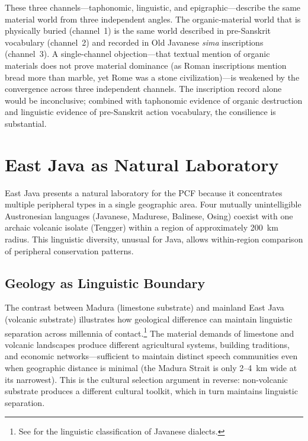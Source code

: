 \documentclass[12pt,a4paper]{article}
\begin{document}
These three channels---taphonomic, linguistic, and epigraphic---describe the same material world from three independent angles. The organic-material world that is physically buried (channel~1) is the same world described in pre-Sanskrit vocabulary (channel~2) and recorded in Old Javanese \emph{sima} inscriptions (channel~3). A single-channel objection---that textual mention of organic materials does not prove material dominance (as Roman inscriptions mention bread more than marble, yet Rome was a stone civilization)---is weakened by the convergence across three independent channels. The inscription record alone would be inconclusive; combined with taphonomic evidence of organic destruction and linguistic evidence of pre-Sanskrit action vocabulary, the consilience is substantial.

\section{East Java as Natural Laboratory}
\label{sec:eastjava}

East Java presents a natural laboratory for the PCF because it concentrates multiple peripheral types in a single geographic area. Four mutually unintelligible Austronesian languages (Javanese, Madurese, Balinese, Osing) coexist with one archaic volcanic isolate (Tengger) within a region of approximately 200~km radius. This linguistic diversity, unusual for Java, allows within-region comparison of peripheral conservation patterns.

\subsection{Geology as Linguistic Boundary}

The contrast between Madura (limestone substrate) and mainland East Java (volcanic substrate) illustrates how geological difference can maintain linguistic separation across millennia of contact.\footnote{See \autocite{nothofer1975reconstruction} for the linguistic classification of Javanese dialects.} The material demands of limestone and volcanic landscapes produce different agricultural systems, building traditions, and economic networks---sufficient to maintain distinct speech communities even when geographic distance is minimal (the Madura Strait is only 2--4~km wide at its narrowest). This is the cultural selection argument in reverse: non-volcanic substrate produces a different cultural toolkit, which in turn maintains linguistic separation.
\end{document}
